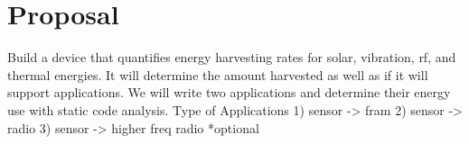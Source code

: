 \section{Proposal} %
\label{sec:proposal}


Build a device that quantifies energy harvesting rates for solar, vibration, rf, and thermal energies.
It will determine the amount harvested as well as if it will support applications.
We will write two applications and determine their energy use with static code analysis.
Type of Applications
1) sensor -> fram
2) sensor -> radio
3) sensor -> higher freq radio *optional
